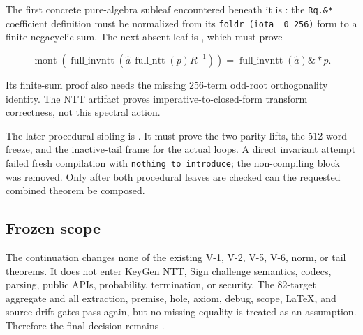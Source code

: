 The first concrete pure-algebra subleaf encountered beneath it is
: the \texttt{Rq.\&*} coefficient
definition must be normalized from its
\texttt{foldr (iota\_ 0 256)} form to a finite negacyclic sum.  The next absent
leaf is , which must prove

\[
  \operatorname{mont}\!\left(\operatorname{full\_invntt}
    (\widehat a\,\operatorname{full\_ntt}(p)R^{-1})\right)
  = \operatorname{full\_invntt}(\widehat a)\mathbin{\&*}p.
\]

Its finite-sum proof also needs the missing 256-term odd-root orthogonality
identity.  The NTT artifact proves imperative-to-closed-form transform
correctness, not this spectral action.

The later procedural sibling is
.  It must prove the two parity
lifts, the 512-word freeze, and the inactive-tail frame for the actual loops.
A direct invariant attempt failed fresh compilation with
\texttt{nothing to introduce}; the non-compiling block was removed.  Only
after both procedural leaves are checked can the requested combined theorem
be composed.

\subsection*{Frozen scope}

The continuation changes none of the existing V-1, V-2, V-5, V-6, norm, or
tail theorems.  It does not enter KeyGen NTT, Sign challenge semantics,
codecs, parsing, public APIs, probability, termination, or security.  The
82-target aggregate and all extraction, premise, hole, axiom, debug, scope,
LaTeX, and source-drift gates pass again, but no missing equality is treated
as an assumption.  Therefore the final decision remains
.
